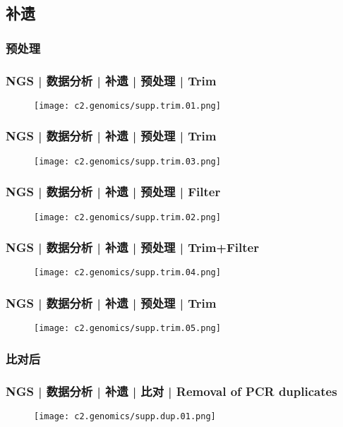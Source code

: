 \subsection{补遗}
\subsubsection{预处理}
\begin{frame}
  \frametitle{NGS | 数据分析 | 补遗 | 预处理 | Trim}
  \begin{figure}
    \centering
    \texttt{[image: c2.genomics/supp.trim.01.png]}
  \end{figure}
\end{frame}

\begin{frame}
  \frametitle{NGS | 数据分析 | 补遗 | 预处理 | Trim}
  \begin{figure}
    \centering
    \texttt{[image: c2.genomics/supp.trim.03.png]}
  \end{figure}
\end{frame}

\begin{frame}
  \frametitle{NGS | 数据分析 | 补遗 | 预处理 | Filter}
  \begin{figure}
    \centering
    \texttt{[image: c2.genomics/supp.trim.02.png]}
  \end{figure}
\end{frame}

\begin{frame}
  \frametitle{NGS | 数据分析 | 补遗 | 预处理 | Trim+Filter}
  \begin{figure}
    \centering
    \texttt{[image: c2.genomics/supp.trim.04.png]}
  \end{figure}
\end{frame}

\begin{frame}
  \frametitle{NGS | 数据分析 | 补遗 | 预处理 | Trim}
  \begin{figure}
    \centering
    \texttt{[image: c2.genomics/supp.trim.05.png]}
  \end{figure}
\end{frame}

\subsubsection{比对后}
\begin{frame}
  \frametitle{NGS | 数据分析 | 补遗 | 比对 | Removal of PCR duplicates}
  \begin{figure}
    \centering
    \texttt{[image: c2.genomics/supp.dup.01.png]}
  \end{figure}
\end{frame}

